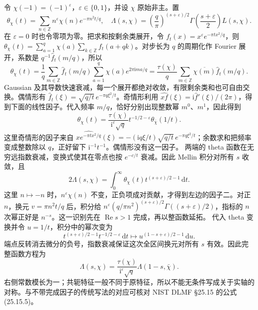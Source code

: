 令 \(\chi(-1)=(-1)^\varepsilon\)，\(\varepsilon\in\{0,1\}\)，并设 \(\chi\) 原始非主。置
\[
 \theta_\chi(t)=\sum_{n\in\mathbb Z}n^\varepsilon\chi(n)e^{-\pi n^2t/q},
 \quad \Lambda(s,\chi)=\left(\frac q\pi\right)^{(s+\varepsilon)/2}
 \Gamma\left(\frac{s+\varepsilon}2\right)L(s,\chi).
\]
在 \(\varepsilon=0\) 时也令零项为零。把求和按剩余类展开，令 \(f_t(x)=x^\varepsilon e^{-\pi t x^2/q}\)，则
\(\theta_\chi(t)=\sum_{a=1}^q\chi(a)\sum_{k\in\mathbb Z}f_t(a+qk)\)。对步长为 \(q\) 的周期化作 Fourier 展开，系数是 \(q^{-1}\widehat f_t(m/q)\)，所以
\[
 \theta_\chi(t)=\frac1q\sum_{m\in\mathbb Z}\widehat f_t(m/q)
       \sum_{a=1}^q\chi(a)e^{2\pi\mathrm{i}ma/q}
 =\frac{\tau(\chi)}q\sum_{m\in\mathbb Z}\overline{\chi(m)}\widehat f_t(m/q).
\]
Gaussian 及其导数快速衰减，每一个展开都绝对收敛，有限剩余类和也可自由交换。偶情形有
\(\widehat f_t(\xi)=\sqrt{q/t}\,e^{-\pi q\xi^2/t}\)。奇情形利用 \(\widehat{xf}(\xi)=\mathrm{i}\widehat f'(\xi)/(2\pi)\)，得到下面的线性因子。代入频率 \(m/q\)，恰好分别出现整数幂 \(m^0\)、\(m^1\)，因此得到
\[
 \theta_\chi(t)=\frac{\tau(\chi)}{\mathrm{i}^{\varepsilon}\sqrt q}
 t^{-1/2-\varepsilon}\theta_{\bar\chi}(1/t).
\]
这里奇情形的因子来自 \(\widehat{x e^{-\pi tx^2/q}}(\xi)=-(\mathrm{i}q\xi/t)\sqrt{q/t}\,e^{-\pi q\xi^2/t}\)；余数求和把频率变成整数除以 \(q\)，正好留下 \(\mathrm{i}^{-1}t^{-1}\)。偶情形没有这一因子。
\ProseParagraphBreak
两端的 theta 函数在无穷远指数衰减，变换式使其在零点也按 \(e^{-c/t}\) 衰减。因此 Mellin 积分对所有 \(s\) 收敛，且
\[
 2\Lambda(s,\chi)=\int_0^\infty\theta_\chi(t)t^{(s+\varepsilon)/2-1}\,\mathrm{d}t.
\]
这里 \(n\mapsto-n\) 时，\(n^\varepsilon\chi(n)\) 不变，正负项成对贡献，才得到左边的因子二。对正 \(n\)，换元 \(v=\pi n^2t/q\) 后，积分给
\(n^\varepsilon(q/\pi n^2)^{(s+\varepsilon)/2}\Gamma((s+\varepsilon)/2)\)，指标的 \(n\) 次幂正好是 \(n^{-s}\)。这一识别先在 \(\operatorname{Re}s>1\) 完成，再以整函数延拓。
\ProseParagraphBreak
代入 theta 变换并令 \(u=1/t\)，积分中的幂次变为
\[
 t^{(s+\varepsilon)/2-1}t^{-1/2-\varepsilon}\,\mathrm{d}t
 \longmapsto u^{(1-s+\varepsilon)/2-1}\,\mathrm{d}u.
\]
端点反转消去微分的负号，指数衰减保证这次全区间换元对所有 \(s\) 有效。因此完整函数方程为
\begin{equation}\label{b3:eq:D-functional-equation}
 \Lambda(s,\chi)=\frac{\tau(\chi)}{\mathrm{i}^{\varepsilon}\sqrt q}
                      \Lambda(1-s,\bar\chi).
\end{equation}
右侧常数模长为一；共轭特征一般不同于原特征，所以不能无条件写成关于实轴的对称。与不带完成因子的传统写法的对应可核对 NIST DLMF §25.15 的公式(25.15.5)\cite{NationalInstituteofStandardsNIST}。

